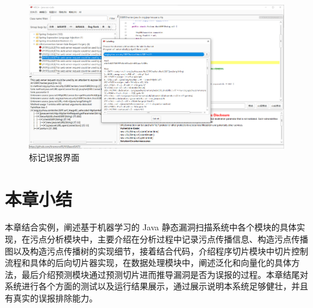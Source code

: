 \begin{figure}[H]
    \centering
    \includegraphics[width=0.8\linewidth]{FIGs/chapter4/labelFP.png}
    \caption{标记误报界面}\label{show:labelFP}
\end{figure}


\section{本章小结}

本章结合实例，阐述基于机器学习的 Java 静态漏洞扫描系统中各个模块的具体实现，在污点分析模块中，主要介绍在分析过程中记录污点传播信息、构造污点传播图以及构造污点传播树的实现细节，接着结合代码，介绍程序切片模块中切片控制流程和具体的后向切片器实现，在数据处理模块中，阐述泛化和向量化的具体方法，最后介绍预测模块通过预测切片进而推导漏洞是否为误报的过程。本章结尾对系统进行各个方面的测试以及运行结果展示，通过展示说明本系统足够健壮，并且有真实的误报排除能力。

